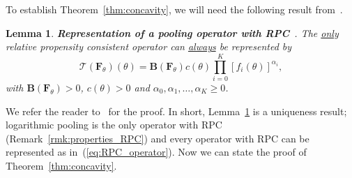 \documentclass[a4paper, notitlepage, 11pt]{article}
\newtheorem{lemma}{Lemma}[]
\begin{document}
To establish Theorem~\ref{thm:concavity}, we will need the following result from~\cite{Genest1984}.
\begin{lemma}
\label{lem:RPC_representation}
\textbf{Representation of a pooling operator with RPC}~\citep[eq. 3.1]{Genest1984}.
The \underline{only} relative propensity consistent operator can \underline{always} be represented by
\begin{equation}
 \label{eq:RPC_operator}
 \mathcal{T} \left( \boldsymbol F_\theta \right)(\theta) = \boldsymbol B\left( \boldsymbol F_\theta \right) c(\theta) \prod_{i=0}^K \left[f_i(\theta) \right]^{\alpha_i},
\end{equation}
with $\boldsymbol B\left( \boldsymbol F_\theta \right) > 0$, $c(\theta) >0$  and $\alpha_0, \alpha_1, \ldots, \alpha_K \geq 0$. 
\end{lemma}
We refer the reader to~\cite{Genest1984} for the proof.
In short, Lemma~\ref{lem:RPC_representation} is a uniqueness result; logarithmic pooling is the only operator with RPC (Remark~\ref{rmk:properties_RPC}) and every operator with RPC can be represented as in~(\ref{eq:RPC_operator}). 
Now we can state the proof of Theorem~\ref{thm:concavity}.
\end{document}
